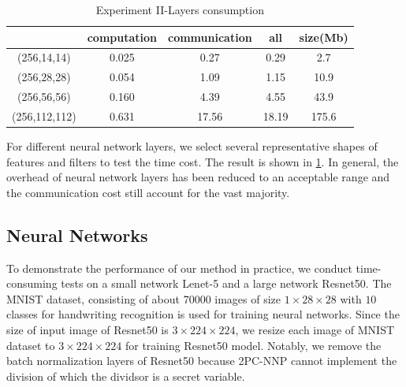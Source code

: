\documentclass[letterpaper]{article} %
\begin{document}
\begin{table}[!ht]
{\begin{tabular}{|c|c|c|c|c|c|}
        \cline{3-5}
        \multicolumn{2}{|c|}{} &computation&communication&all&size(Mb)\\ \hline
        \multicolumn{2}{|c|}{(256,14,14)} & 0.025  & 0.27 & 0.29 &2.7	\\ \hline
        \multicolumn{2}{|c|}{(256,28,28)} & 0.054 & 1.09 & 1.15 & 10.9 \\ \hline
        \multicolumn{2}{|c|}{(256,56,56)} & 0.160  & 4.39 & 4.55 &43.9	\\ \hline 
        \multicolumn{2}{|c|}{(256,112,112)} & 0.631 & 17.56 & 18.19 & 175.6 \\ \hline  

        \end{tabular}}

        \caption{Experiment II-Layers consumption}
        \label{Layers_consumption}
    \end{table}


    For different neural network layers, 
    we select several representative shapes of features and filters 
    to test the time cost.
    The result is shown in \ref{Layers_consumption}.
    In general, the overhead of neural network layers has been reduced to an acceptable range
    and the communication cost still account for the vast majority.






    \subsection{Neural Networks}
    To demonstrate the performance of our method in practice, we conduct 
    time-consuming tests on a small network Lenet-5 and a large network Resnet50.
    The MNIST dataset, consisting of about 70000 images of size $1\times 28 \times 28$ with $10$ classes 
    for handwriting recognition is used for training neural networks. 
    Since the size of input image of Resnet50 is $3\times 224 \times 224$,
    we resize each image of MNIST dataset to $3\times 224 \times 224$ for training Resnet50 model.
    Notably, we remove the batch normalization layers of Resnet50 because 2PC-NNP
    cannot implement the division of which the dividsor is a secret variable.
\end{document}
